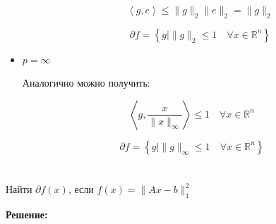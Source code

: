 \documentclass[a4paper,12pt]{article}
\newcommand{\lt}{\left}
\newcommand{\rt}{\right}
\newcommand{\p}{\partial}
\newcommand{\fr}{\frac}
\newcommand{\bb}{\mathbb}
\begin{document}
\begin{itemize}
\begin{itemize}
	$$\lt\langle g, e\rt\rangle \le \|g\|_2\|e\|_2 = \|g\|_2$$
	
	$$\p f = \lt\{g\mid \|g\|_2 \le 1 \quad \forall x\in \bb R^n \rt\}$$
	
\end{itemize}
	\item $p = \infty$
	
	Аналогично можно получить:
	
	$$\lt\langle g, \fr{x}{\|x\|_{\infty}}\rt\rangle \le 1 \quad \forall x\in \bb R^n$$
	
	$$\p f = \lt\{g\mid \|g\|_{\infty} \le 1 \quad \forall x\in \bb R^n \rt\}$$
\end{itemize}


\section{}

Найти $\partial f(x)$, если $f(x) = \|Ax - b\|_1^2$

\vspace{\baselineskip}

\textbf{Решение:}
\end{document}
